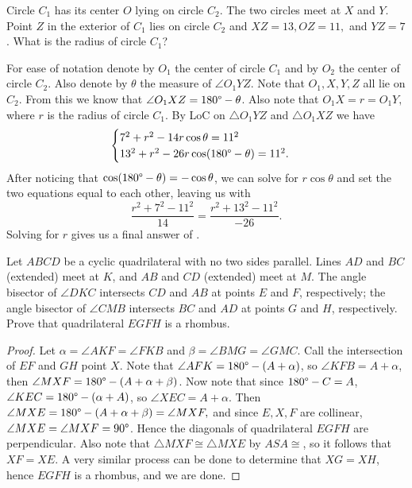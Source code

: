 \documentclass[letterpaper,oneside]{scrartcl}
\begin{document}
\begin{problem*}
  Circle \(C_1\) has its center \(O\) lying on circle \(C_2\). The two circles meet at \(X\) and \(Y\). Point \(Z\) in the exterior of \(C_1\) lies on circle \(C_2\) and \(XZ=13,OZ=11,\) and \(YZ=7\). What is the radius of circle \(C_1\)?
\end{problem*}
\begin{soln}
  For ease of notation denote by \(O_1\) the center of circle \(C_1\) and by \(O_2\) the center of circle \(C_2\). Also denote by \(\theta\) the measure of \(\angle O_1YZ\). Note that \(O_1, X,Y,Z\) all lie on \(C_2\). From this we know that \(\angle O_1XZ = 180\degree - \theta\). Also note that \(O_1X=r=O_1Y,\) where \(r\) is the radius of circle \(C_1\). By LoC on \(\triangle O_1YZ\) and \(\triangle O_1XZ\) we have
  \[
    \begin{cases}
      7^2+r^2-14r\cos\theta=11^2 \\
      13^2+r^2-26r\cos(180\degree-\theta)=11^2.
    \end{cases}
  \]
  After noticing that \(\cos(180\degree-\theta)=-\cos\theta\), we can solve for \(r\cos\theta\) and set the two equations equal to each other, leaving us with
  \[\frac{r^2+7^2-11^2}{14}=\frac{r^2+13^2-11^2}{-26}.\]
  Solving for \(r\) gives us a final answer of .
\end{soln}
\begin{problem*}
  Let \(ABCD\) be a cyclic quadrilateral with no two sides parallel. Lines \(AD\) and \(BC\) (extended) meet at \(K\), and \(AB\) and \(CD\) (extended) meet at \(M\). The angle bisector of \(\angle DKC\) intersects \(CD\) and \(AB\) at points \(E\) and \(F\), respectively; the angle bisector of \(\angle CMB\) intersects \(BC\) and \(AD\) at points \(G\) and \(H\), respectively. Prove that quadrilateral \(EGFH\) is a rhombus.
\end{problem*}
\begin{proof}
  Let \(\alpha = \angle AKF = \angle FKB\) and \(\beta = \angle BMG = \angle GMC\). Call the intersection of \(EF\) and \(GH\) point \(X\). Note that \(\angle AFK = 180\degree - (A + \alpha)\), so \(\angle KFB = A + \alpha\), then \(\angle MXF = 180\degree - (A + \alpha + \beta)\). Now note that since \(180\degree - C = A\), \(\angle KEC = 180\degree - (\alpha + A)\), so \(\angle XEC = A + \alpha \). Then \(\angle MXE = 180\degree - (A + \alpha + \beta) = \angle MXF,\) and since \(E,X,F\) are collinear, \(\angle MXE = \angle MXF = 90\degree\). Hence the diagonals of quadrilateral \(EGFH\) are perpendicular. Also note that \(\triangle MXF \cong \triangle MXE\) by \(ASA\cong\), so it follows that \(XF = XE\). A very similar process can be done to determine that \(XG = XH\), hence \(EGFH\) is a rhombus, and we are done.
\end{proof}
\end{document}
